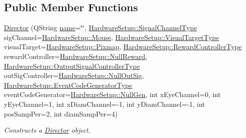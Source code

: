 \subsection*{Public Member Functions}
\begin{DoxyCompactItemize}
\item 
\hyperlink{class_director_a0e111a20f337fe453a6e4d7d72a60745}{Director} (Q\-String \hyperlink{class_director_a757af6de79d8409b98d3d29db654ebf1}{name}=\char`\"{}\char`\"{}, \hyperlink{class_hardware_setup_a47f2dfba54bc1a8d0bbd64d885d638e6}{Hardware\-Setup\-::\-Signal\-Channel\-Type} sig\-Channel=\hyperlink{class_hardware_setup_a47f2dfba54bc1a8d0bbd64d885d638e6aa0e71632c05842ebd76e1cf2d3e9d03e}{Hardware\-Setup\-::\-Mouse}, \hyperlink{class_hardware_setup_a69c004a7774626593182bda8c88c1005}{Hardware\-Setup\-::\-Visual\-Target\-Type} visual\-Target=\hyperlink{class_hardware_setup_a69c004a7774626593182bda8c88c1005a907396ec61e0de7775ba86d887af5457}{Hardware\-Setup\-::\-Pixmap}, \hyperlink{class_hardware_setup_adca8a1e846871351eea56002364cd9bf}{Hardware\-Setup\-::\-Reward\-Controller\-Type} reward\-Controller=\hyperlink{class_hardware_setup_adca8a1e846871351eea56002364cd9bfa6d983e58d740737e1054ee313b2771a0}{Hardware\-Setup\-::\-Null\-Reward}, \hyperlink{class_hardware_setup_a7bf652582f22ceef095add24e855625b}{Hardware\-Setup\-::\-Output\-Signal\-Controller\-Type} out\-Sig\-Controller=\hyperlink{class_hardware_setup_a7bf652582f22ceef095add24e855625ba64fe06dc1692650e0396f9577e0eac9a}{Hardware\-Setup\-::\-Null\-Out\-Sig}, \hyperlink{class_hardware_setup_a5577404a1cb597cc0d78bc56c9acac00}{Hardware\-Setup\-::\-Event\-Code\-Generator\-Type} event\-Code\-Generator=\hyperlink{class_hardware_setup_a5577404a1cb597cc0d78bc56c9acac00a68b2acabc843c750fdd9297f65959c39}{Hardware\-Setup\-::\-Null\-Gen}, int x\-Eye\-Channel=0, int y\-Eye\-Channel=1, int x\-Diam\-Channel=-\/1, int y\-Diam\-Channel=-\/1, int pos\-Samp\-Per=2, int diam\-Samp\-Per=4)
\begin{DoxyCompactList}\small\item\em Constructs a \hyperlink{class_director}{Director} object. \end{DoxyCompactList}\end{DoxyCompactItemize}
